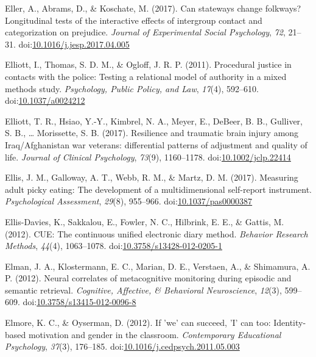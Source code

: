 \documentclass[english,man]{apa6}
\theoremstyle{definition}
\theoremstyle{definition}
\theoremstyle{definition}
\theoremstyle{remark}
\begin{document}
\hypertarget{ref-Eller2017}{}
Eller, A., Abrams, D., \& Koschate, M. (2017). Can stateways change
folkways? Longitudinal tests of the interactive effects of intergroup
contact and categorization on prejudice. \emph{Journal of Experimental
Social Psychology}, \emph{72}, 21--31.
doi:\href{https://doi.org/10.1016/j.jesp.2017.04.005}{10.1016/j.jesp.2017.04.005}

\hypertarget{ref-Elliott2011}{}
Elliott, I., Thomas, S. D. M., \& Ogloff, J. R. P. (2011). Procedural
justice in contacts with the police: Testing a relational model of
authority in a mixed methods study. \emph{Psychology, Public Policy, and
Law}, \emph{17}(4), 592--610.
doi:\href{https://doi.org/10.1037/a0024212}{10.1037/a0024212}

\hypertarget{ref-Elliott2017}{}
Elliott, T. R., Hsiao, Y.-Y., Kimbrel, N. A., Meyer, E., DeBeer, B. B.,
Gulliver, S. B., \ldots{} Morissette, S. B. (2017). Resilience and
traumatic brain injury among Iraq/Afghanistan war veterans: differential
patterns of adjustment and quality of life. \emph{Journal of Clinical
Psychology}, \emph{73}(9), 1160--1178.
doi:\href{https://doi.org/10.1002/jclp.22414}{10.1002/jclp.22414}

\hypertarget{ref-Ellis2017}{}
Ellis, J. M., Galloway, A. T., Webb, R. M., \& Martz, D. M. (2017).
Measuring adult picky eating: The development of a multidimensional
self-report instrument. \emph{Psychological Assessment}, \emph{29}(8),
955--966.
doi:\href{https://doi.org/10.1037/pas0000387}{10.1037/pas0000387}

\hypertarget{ref-Ellis-Davies2012}{}
Ellis-Davies, K., Sakkalou, E., Fowler, N. C., Hilbrink, E. E., \&
Gattis, M. (2012). CUE: The continuous unified electronic diary method.
\emph{Behavior Research Methods}, \emph{44}(4), 1063--1078.
doi:\href{https://doi.org/10.3758/s13428-012-0205-1}{10.3758/s13428-012-0205-1}

\hypertarget{ref-Elman2012}{}
Elman, J. A., Klostermann, E. C., Marian, D. E., Verstaen, A., \&
Shimamura, A. P. (2012). Neural correlates of metacognitive monitoring
during episodic and semantic retrieval. \emph{Cognitive, Affective, \&
Behavioral Neuroscience}, \emph{12}(3), 599--609.
doi:\href{https://doi.org/10.3758/s13415-012-0096-8}{10.3758/s13415-012-0096-8}

\hypertarget{ref-Elmore2012}{}
Elmore, K. C., \& Oyserman, D. (2012). If 'we' can succeed, 'I' can too:
Identity-based motivation and gender in the classroom.
\emph{Contemporary Educational Psychology}, \emph{37}(3), 176--185.
doi:\href{https://doi.org/10.1016/j.cedpsych.2011.05.003}{10.1016/j.cedpsych.2011.05.003}
\end{document}
